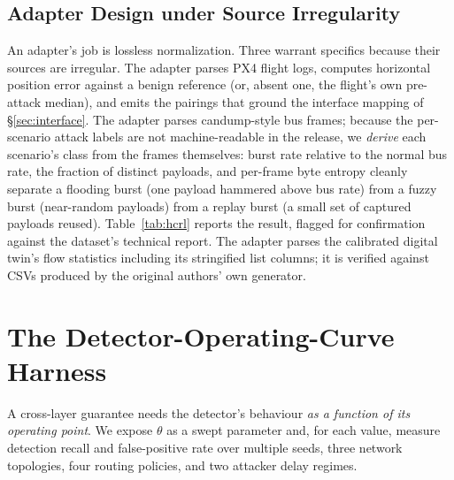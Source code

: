 \subsection{Adapter Design under Source Irregularity}
An adapter's job is lossless normalization. Three warrant specifics because
their sources are irregular. The  adapter parses PX4
flight logs, computes horizontal position error against a benign reference (or,
absent one, the flight's own pre-attack median), and emits the
 pairings that ground the interface mapping of
\S\ref{sec:interface}. The  adapter parses candump-style
bus frames; because the per-scenario attack labels are not machine-readable in
the release, we \emph{derive} each scenario's class from the frames
themselves: burst rate relative to the normal bus rate, the fraction of
distinct payloads, and per-frame byte entropy cleanly separate a flooding burst
(one payload hammered above bus rate) from a fuzzy burst (near-random payloads)
from a replay burst (a small set of captured payloads reused).
Table~\ref{tab:hcrl} reports the result, flagged for confirmation against the
dataset's technical report. The  adapter parses the calibrated
digital twin's flow statistics including its stringified list columns; it is
verified against CSVs produced by the original authors' own generator.

\begin{table}[t]
\centering
\caption{Real ingested corpus. Counts are from schema-validated adapter outputs;
every record validates against the schema of \S\ref{sec:schema}.}
\label{tab:ingest}
\small
\renewcommand{\arraystretch}{1.1}

\end{table}

\begin{table}[t]
\centering
\caption{Frame-derived attack classes for the  scenarios,
inferred from burst rate, payload-distinct share, and byte entropy; scenarios
exhibiting more than one burst shape map to .}
\label{tab:hcrl}
\small
\renewcommand{\arraystretch}{1.05}

\end{table}

\section{The Detector-Operating-Curve Harness}
\label{sec:harness}
A cross-layer guarantee needs the detector's behaviour \emph{as a function of
its operating point}. We expose $\theta$ as a swept parameter and, for each
value, measure detection recall and false-positive rate over multiple seeds,
three network topologies, four routing policies, and two attacker delay regimes.

